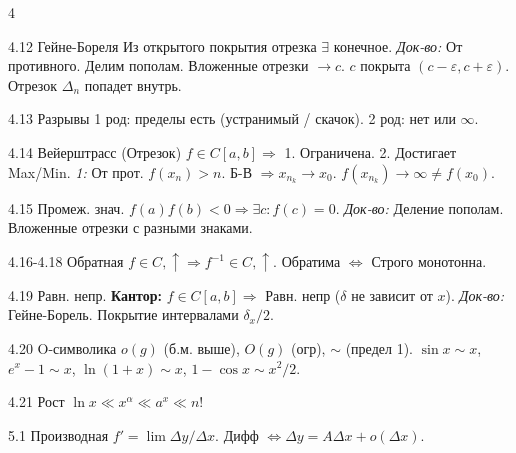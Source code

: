 \documentclass[8pt, a4paper, landscape]{extarticle}
\newcommand{\Ra}{\Rightarrow}
\newcommand{\eps}{\varepsilon}
\begin{document}
\begin{multicols*}{4}
\begin{ticket}{4.12 Гейне-Бореля}
Из открытого покрытия отрезка $\exists$ конечное.
\tcblower
\textit{Док-во:} От противного. Делим пополам. Вложенные отрезки $\to c$.
$c$ покрыта $(c-\eps, c+\eps)$. Отрезок $\Delta_n$ попадет внутрь.
\end{ticket}

\begin{ticket}{4.13 Разрывы}
1 род: пределы есть (устранимый / скачок).
2 род: нет или $\infty$.
\end{ticket}

\begin{ticket}{4.14 Вейерштрасс (Отрезок)}
$f \in C[a,b] \Ra$ 1. Ограничена. 2. Достигает Max/Min.
\tcblower
\textit{1:} От прот. $f(x_n)>n$. Б-В $\Ra x_{n_k} \to x_0$. $f(x_{n_k}) \to \infty \ne f(x_0)$.
\end{ticket}

\begin{ticket}{4.15 Промеж. знач.}
$f(a)f(b)<0 \Ra \exists c: f(c)=0$.
\tcblower
\textit{Док-во:} Деление пополам. Вложенные отрезки с разными знаками.
\end{ticket}

\begin{ticket}{4.16-4.18 Обратная}
$f \in C, \uparrow \Ra f^{-1} \in C, \uparrow$.
Обратима $\iff$ Строго монотонна.
\end{ticket}

\begin{ticket}{4.19 Равн. непр.}
\textbf{Кантор:} $f \in C[a,b] \Ra$ Равн. непр ($\delta$ не зависит от $x$).
\tcblower
\textit{Док-во:} Гейне-Борель. Покрытие интервалами $\delta_x/2$.
\end{ticket}

\begin{ticket}{4.20 O-символика}
$o(g)$ (б.м. выше), $O(g)$ (огр), $\sim$ (предел 1).
$\sin x \sim x$, $e^x-1 \sim x$, $\ln(1+x) \sim x$, $1-\cos x \sim x^2/2$.
\end{ticket}

\begin{ticket}{4.21 Рост}
$\ln x \ll x^\alpha \ll a^x \ll n!$
\end{ticket}


\begin{ticket}{5.1 Производная}
$f' = \lim \Delta y / \Delta x$. Дифф $\iff \Delta y = A \Delta x + o(\Delta x)$.
\end{ticket}


\end{multicols*}
\end{document}
